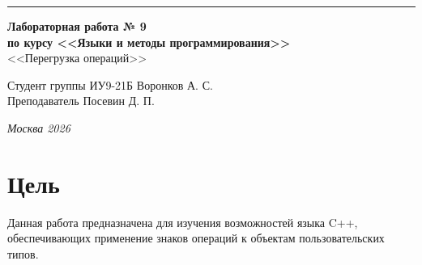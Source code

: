 \documentclass[a4paper, 14pt]{extarticle}
\begin{document}
\begin{titlepage}
\vspace*{-16pt}
\hspace{30pt}\rule{0.866\textwidth}{0.4pt}
  
\vspace{11em}

\begin{center}
\Large {\bf Лабораторная работа № 9} \\ 
\large {\bf по курсу <<Языки и методы программирования>>} \\ 
\large <<Перегрузка операций>>
\end{center}\normalsize

\vspace{8em}


\begin{flushright}
  {Студент группы ИУ9-21Б Воронков А. С.\hspace*{15pt} \\
  \vspace{2ex}
  Преподаватель Посевин Д. П.\hspace*{15pt}}
\end{flushright}

\bigskip

\vfill
 

\begin{center}
\textsl{Москва 2026}
\end{center}
\end{titlepage}

\renewcommand{\ttdefault}{pcr}

\setlength{\tabcolsep}{3pt}
\newpage
\setcounter{page}{2}

\section{Цель}\label{Sect::task}
\par 
Данная работа предназначена для изучения возможностей языка C++, обеспечивающих применение знаков операций к объектам пользовательских типов. 

\pagebreak
\end{document}

